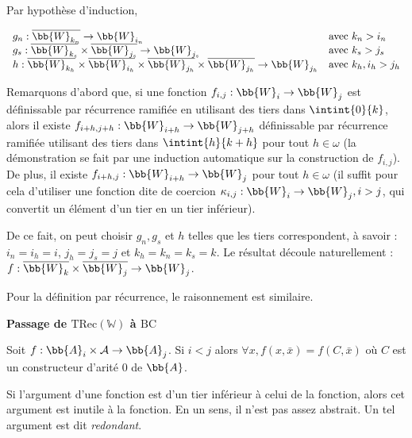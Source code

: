 \documentclass{report}
\newcommand{\TRec}[1]{\text{TRec}\left(\mathbb{#1}\right)}
\begin{document}
\begin{demo}
			Par hypothèse d'induction, 
			
			\[
				\begin{array}{ll}
				g_n : \overline{\bb{W}_{k_n}} \to \bb{W}_{i_n} & \text{avec $k_n > i_n$}\\
				g_s : \overline{\bb{W}_{k_s}} \times \overline{\bb{W}_{j_s}} \to \bb{W}_{j_s} & \text{avec $k_s > j_s$} \\
				h : \overline{\bb{W}_{k_h}} \times \overline{\bb{W}_{i_h}} \times \overline{\bb{W}_{j_h}} \times \overline{\bb{W}_{j_h}} \to \bb{W}_{j_h} & \text{avec $k_h, i_h > j_h$}
				\end{array}
			\]
			
			Remarquons d'abord que, si une fonction $f_{i,j} : \bb{W}_i \to \bb{W}_j$ est définissable par récurrence ramifiée en utilisant des tiers dans $\intint{0}{k}$, alors il existe $f_{i+h, j+h} : \bb{W}_{i+h} \to \bb{W}_{j+h}$ définissable par récurrence ramifiée utilisant des tiers dans $\intint{h}{k+h}$ pour tout $h \in \omega$ (la démonstration se fait par une induction automatique sur la construction de $f_{i,j}$). De plus, il existe $f_{i+h,j} : \bb{W}_{i+h} \to \bb{W}_j$ pour tout $h \in \omega$ (il suffit pour cela d'utiliser une fonction dite de coercion $\kappa_{i,j} : \bb{W}_i \to \bb{W}_j, i>j$, qui convertit un élément d'un tier en un tier inférieur).
			
			De ce fait, on peut choisir $g_n, g_s$ et $h$ telles que les tiers correspondent, à savoir : $i_n = i_h = i$, $j_h = j_s = j$ et $k_h = k_n = k_s = k$. Le résultat découle naturellement : $f : \overline{\bb{W}_{k}} \times \overline{\bb{W}_{j}} \to \bb{W}_{j}$.
			
			Pour la définition par récurrence, le raisonnement est similaire. 
			
			\espace
			
			\textbf{Passage de $\TRec{W}$ à $\text{BC}$}
			
			\begin{lemma}
				\label{lem:arg_redondant}
				Soit $f : \bb{A}_i \times \mathcal{A} \to \bb{A}_j$. Si $i < j$ alors $\forall x, f(x, \bar{x}) = f(C, \bar{x})$ où $C$ est un constructeur d'arité $0$ de $\bb{A}$.
			\end{lemma}
			
			Si l'argument d'une fonction est d'un tier inférieur à celui de la fonction, alors cet argument est inutile à la fonction. En un sens, il n'est pas assez abstrait. Un tel argument est dit \emph{redondant}.
			

\end{demo}
\end{document}
